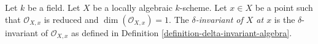 \begin{definition}
\label{definition-delta-invariant}
Let $k$ be a field. Let $X$ be a locally algebraic $k$-scheme.
Let $x \in X$ be a point such that $\mathcal{O}_{X, x}$
is reduced and $\dim(\mathcal{O}_{X, x}) = 1$.
The {\it $\delta$-invariant of $X$ at $x$} is the
$\delta$-invariant of $\mathcal{O}_{X, x}$ as defined in
Definition \ref{definition-delta-invariant-algebra}.
\end{definition}